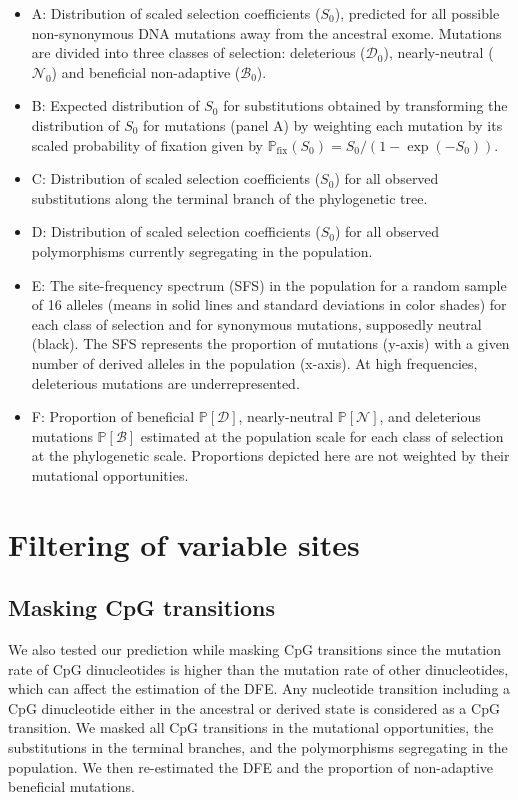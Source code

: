 \documentclass{article}
\newcommand{\proba}{\mathbb{P}}
\newcommand{\Sphy}{S_{0}}
\newcommand{\SphyDel}{\mathcal{D}_0}
\newcommand{\SphyNeu}{\mathcal{N}_0}
\newcommand{\SphyBen}{\mathcal{B}_0}
\newcommand{\SpopDel}{\mathcal{D}}
\newcommand{\SpopNeu}{\mathcal{N}}
\newcommand{\SpopBen}{\mathcal{B}}
\newcommand{\ProbaPopDel}{\proba [ \SpopDel]}
\newcommand{\ProbaPopNeu}{\proba [ \SpopNeu ]}
\newcommand{\ProbaPopBen}{\proba [ \SpopBen ]}
\begin{document}
    \begin{itemize}[itemsep=0pt]
        \item A: Distribution of scaled selection coefficients ($\Sphy$), predicted for all possible non-synonymous DNA mutations away from the ancestral exome.
        Mutations are divided into three classes of selection: deleterious ($\SphyDel$), nearly-neutral ($\SphyNeu$) and beneficial non-adaptive ($\SphyBen$).
        \item B: Expected distribution of $\Sphy$ for substitutions obtained by transforming the distribution of $\Sphy$ for mutations (panel A) by weighting each mutation by its scaled probability of fixation given by $\proba_{\text{fix}} (\Sphy) = \Sphy/(1-\exp(-\Sphy))$.
        \item C: Distribution of scaled selection coefficients ($\Sphy$) for all observed substitutions along the terminal branch of the phylogenetic tree.
        \item D: Distribution of scaled selection coefficients ($\Sphy$) for all observed polymorphisms currently segregating in the population.
        \item E: The site-frequency spectrum (SFS) in the population for a random sample of 16 alleles (means in solid lines and standard deviations in color shades) for each class of selection and for synonymous mutations, supposedly neutral (black). The SFS represents the proportion of mutations (y-axis) with a given number of derived alleles in the population (x-axis). At high frequencies, deleterious mutations are underrepresented.
        \item F: Proportion of beneficial $\ProbaPopDel$, nearly-neutral $\ProbaPopNeu$, and deleterious mutations $\ProbaPopBen$  estimated at the population scale for each class of selection at the phylogenetic scale. Proportions depicted here are not weighted by their mutational opportunities.
    \end{itemize}

    \section{Filtering of variable sites}

    \subsection{Masking CpG transitions}
    We also tested our prediction while masking CpG transitions since the mutation rate of CpG dinucleotides is higher than the mutation rate of other dinucleotides, which can affect the estimation of the DFE.
    Any nucleotide transition including a CpG dinucleotide either in the ancestral or derived state is considered as a CpG transition.
    We masked all CpG transitions in the mutational opportunities, the substitutions in the terminal branches, and the polymorphisms segregating in the population. We then re-estimated the DFE and the proportion of non-adaptive beneficial mutations.
\end{document}
